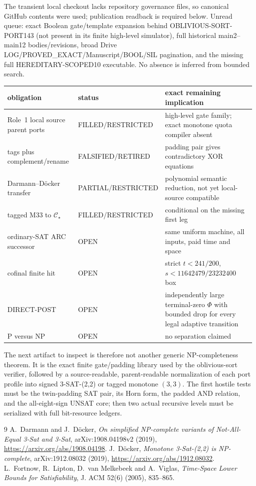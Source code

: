 \documentclass[11pt]{article}
\begin{document}
The transient local checkout lacks repository governance files, so canonical GitHub contents were used; publication readback is required below.  Unread queue: exact Boolean gate/template expansion behind OBLIVIOUS-SORT-PORT143 (not present in its finite high-level simulator), full historical main2--main12 bodies/revisions, broad Drive LOG/PROVED\_EXACT/Manuscript/BOOL/SIL pagination, and the missing full HEREDITARY-SCOPED10 executable.  No absence is inferred from bounded search.

\begin{center}
\begin{tabular}{p{}p{}p{}}
\toprule
obligation & status & exact remaining implication\\
\midrule
Role~1 local source parent ports & FILLED/RESTRICTED & high-level gate family; exact monotone quota compiler absent\\
tags plus complement/rename & FALSIFIED/RETIRED & padding pair gives contradictory XOR equations\\
Darmann--D\"ocker transfer & PARTIAL/RESTRICTED & polynomial semantic reduction, not yet local-source compatible\\
tagged M33 to $\mathcal C_\star$ & FILLED/RESTRICTED & conditional on the missing first leg\\
ordinary-SAT ARC successor & OPEN & same uniform machine, all inputs, paid time and space\\
cofinal finite hit & OPEN & strict $t<241/200$, $s<11642479/23232400$ box\\
DIRECT-POST & OPEN & independently large terminal-zero $\Phi$ with bounded drop for every legal adaptive transition\\
P versus NP & OPEN & no separation claimed\\
\bottomrule
\end{tabular}
\end{center}

The next artifact to inspect is therefore not another generic NP-completeness theorem.  It is the exact finite gate/padding library used by the oblivious-sort verifier, followed by a source-readable, parent-readable normalization of each port profile into signed 3-SAT-(2,2) or tagged monotone $(3,3)$.  The first hostile tests must be the twin-padding SAT pair, its Horn form, the padded AND relation, and the all-eight-sign UNSAT core; then two actual recursive levels must be serialized with full bit-resource ledgers.

\begin{thebibliography}{9}
 A.~Darmann and J.~D\"ocker, \emph{On simplified NP-complete variants of Not-All-Equal 3-Sat and 3-Sat}, arXiv:1908.04198v2 (2019), \url{https://arxiv.org/abs/1908.04198}.
 J.~D\"ocker, \emph{Monotone 3-Sat-(2,2) is NP-complete}, arXiv:1912.08032 (2019), \url{https://arxiv.org/abs/1912.08032}.
 L.~Fortnow, R.~Lipton, D.~van Melkebeek and A.~Viglas, \emph{Time-Space Lower Bounds for Satisfiability}, J. ACM 52(6) (2005), 835--865.
\end{thebibliography}

\end{document}
